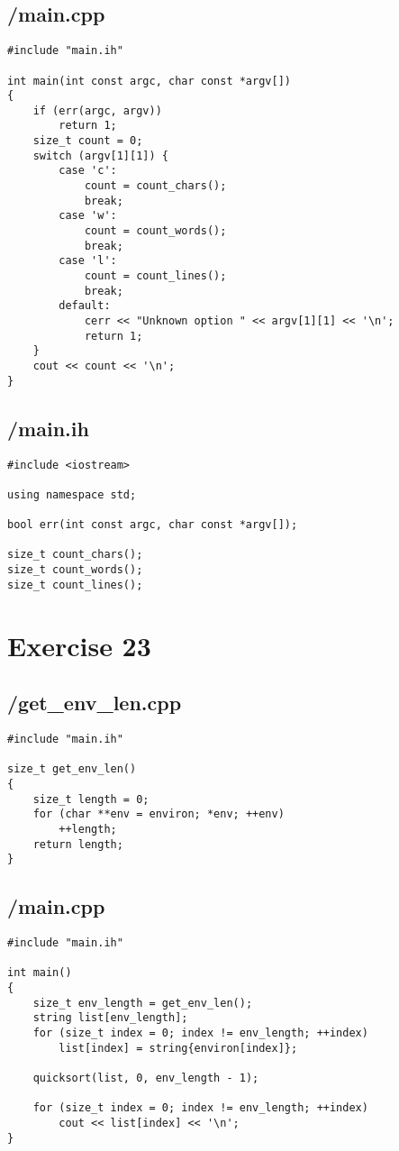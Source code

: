 \documentclass{article}
\begin{document}
\subsection*{/main.cpp}
\begin{verbatim}
#include "main.ih"

int main(int const argc, char const *argv[])
{
    if (err(argc, argv))
        return 1;
    size_t count = 0;
    switch (argv[1][1]) {
        case 'c':
            count = count_chars();
            break;
        case 'w':
            count = count_words();
            break;
        case 'l':
            count = count_lines();
            break;
        default:
            cerr << "Unknown option " << argv[1][1] << '\n';
            return 1;
    }
    cout << count << '\n';
}

\end{verbatim}
\subsection*{/main.ih}
\begin{verbatim}
#include <iostream>

using namespace std;

bool err(int const argc, char const *argv[]);

size_t count_chars();
size_t count_words();
size_t count_lines();

\end{verbatim}

\section*{Exercise 23}
\subsection*{/get\_env\_len.cpp}
\begin{verbatim}
#include "main.ih"

size_t get_env_len()
{
    size_t length = 0;
    for (char **env = environ; *env; ++env)
        ++length;
    return length;
}
\end{verbatim}
\subsection*{/main.cpp}
\begin{verbatim}
#include "main.ih"

int main()
{
    size_t env_length = get_env_len();
    string list[env_length];
    for (size_t index = 0; index != env_length; ++index)
        list[index] = string{environ[index]};

    quicksort(list, 0, env_length - 1);

    for (size_t index = 0; index != env_length; ++index)
        cout << list[index] << '\n';
}

\end{verbatim}
\end{document}

